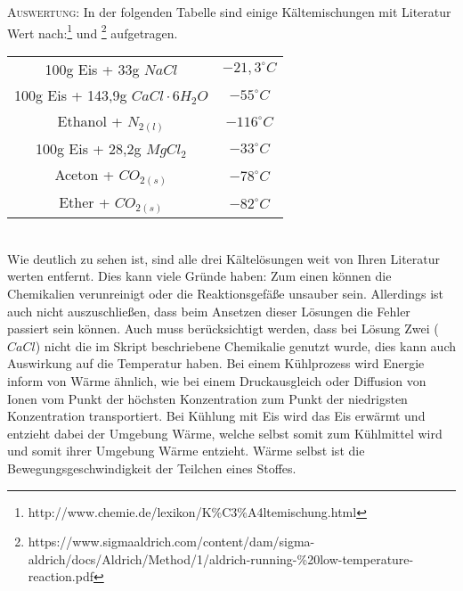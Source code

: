 \documentclass[A4paper, 11p]{article}
\begin{document}
\textsc{Auswertung:}\hspace{8mm} In der folgenden Tabelle sind einige Kältemischungen mit Literatur Wert nach:\footnote{http://www.chemie.de/lexikon/K\%C3\%A4ltemischung.html} und \footnote{https://www.sigmaaldrich.com/content/dam/sigma-aldrich/docs/Aldrich/Method/1/aldrich-running-\%20low-temperature-reaction.pdf} aufgetragen.\\

\begin{tabular}{cc}
100g Eis + 33g $NaCl$ & $-21,3^\circ C$\\
100g Eis + 143,9g $CaCl\cdot 6H_2O$ & $-55^\circ C$\\
Ethanol + $N_{2(l)}$ & $-116^\circ C$ \\
100g Eis + 28,2g $MgCl_2$ & $-33^\circ C$\\
Aceton + $CO_{2(s)}$ & $-78^\circ C$\\
Ether + $CO_{2(s)}$ & $-82^\circ C$\\
\end{tabular}\\

Wie deutlich zu sehen ist, sind alle drei Kältelösungen weit von Ihren Literatur werten entfernt. Dies kann viele Gründe haben: Zum einen können die Chemikalien verunreinigt oder die Reaktionsgefäße unsauber sein. Allerdings ist auch nicht auszuschließen, dass beim Ansetzen dieser Lösungen die Fehler passiert sein können. Auch muss berücksichtigt werden, dass bei Lösung Zwei ($CaCl$) nicht die im Skript beschriebene Chemikalie genutzt wurde, dies kann auch Auswirkung auf die Temperatur haben. Bei einem Kühlprozess wird Energie inform von Wärme ähnlich, wie bei einem Druckausgleich oder Diffusion von Ionen vom Punkt der höchsten Konzentration zum Punkt der niedrigsten Konzentration transportiert. Bei Kühlung mit Eis wird das Eis erwärmt und entzieht dabei der Umgebung Wärme, welche selbst somit zum Kühlmittel wird und somit ihrer Umgebung Wärme entzieht. Wärme selbst ist die Bewegungsgeschwindigkeit der Teilchen eines Stoffes.

\newpage
\end{document}
